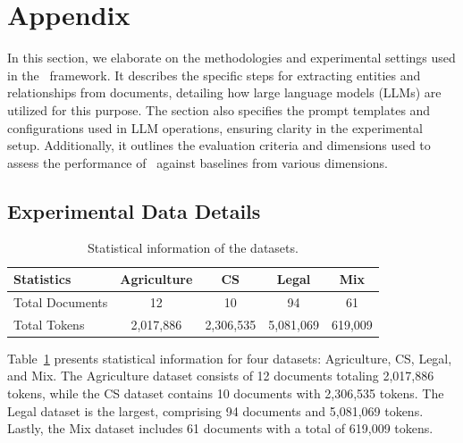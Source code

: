 \section{Appendix}
\label{app:appendix}
In this section, we elaborate on the methodologies and experimental settings used in the \model\ framework. It describes the specific steps for extracting entities and relationships from documents, detailing how large language models (LLMs) are utilized for this purpose. The section also specifies the prompt templates and configurations used in LLM operations, ensuring clarity in the experimental setup. Additionally, it outlines the evaluation criteria and dimensions used to assess the performance of \model\ against baselines from various dimensions.

\subsection{Experimental Data Details}

\begin{table}[h]
\caption{Statistical information of the datasets.}
\label{dataset}
\centering
\begin{tabular}{lcccc}
\toprule
\textbf{Statistics}  & \textbf{Agriculture} & \textbf{CS} & \textbf{Legal} & \textbf{Mix} \\
\midrule
Total Documents & 12  & 10  & 94  & 61  \\
Total Tokens    & 2,017,886 & 2,306,535 & 5,081,069 & 619,009 \\
\bottomrule
\end{tabular}
\end{table}

Table~\ref{dataset} presents statistical information for four datasets: Agriculture, CS, Legal, and Mix. The Agriculture dataset consists of 12 documents totaling 2,017,886 tokens, while the CS dataset contains 10 documents with 2,306,535 tokens. The Legal dataset is the largest, comprising 94 documents and 5,081,069 tokens. Lastly, the Mix dataset includes 61 documents with a total of 619,009 tokens.

\vspace{-0.1in}
